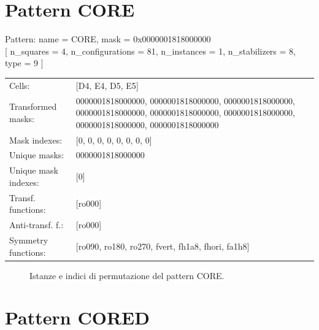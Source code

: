 \section{Pattern CORE}

\begin{tcolorbox}[sharp corners, fontupper=\ttfamily\small, colback=white]
  \noindent Pattern: name = CORE, mask = 0x0000001818000000\\
  {[} n\_squares = 4, n\_configurations = 81,
  n\_instances = 1, n\_stabilizers = 8, type = 9 { ]}\\[1.0ex]
  \begin{tabularx}{\textwidth}{@{} p{3.5cm} X @{}}
    Cells:               & {[}D4, E4, D5, E5{]}\\[0.5ex]
    Transformed masks:   & 0000001818000000, 0000001818000000, 0000001818000000, 0000001818000000, 0000001818000000, 0000001818000000, 0000001818000000, 0000001818000000\\[0.5ex]
    Mask indexes:        & {[}0, 0, 0, 0, 0, 0, 0, 0{]}\\[0.5ex]
    Unique masks:        & 0000001818000000\\[0.5ex]
    Unique mask indexes: & {[}0{]}\\[0.5ex]
    Transf. functions:   & {[}ro000{]}\\[0.5ex]
    Anti-transf. f.:     & {[}ro000{]}\\[0.5ex]
    Symmetry functions:  & {[}ro090, ro180, ro270, fvert, fh1a8, fhori, fa1h8{]}\\[0.5ex]
  \end{tabularx}
\end{tcolorbox}

\begin{figure}[htbp]
  \centering
   \hfill
   \hfill
   \hfill
  \vspace{0.3cm}
   \hfill
   \hfill
   \hfill
  \caption{Istanze e indici di permutazione del pattern CORE.}
\end{figure}

\newpage

\section{Pattern CORED}

